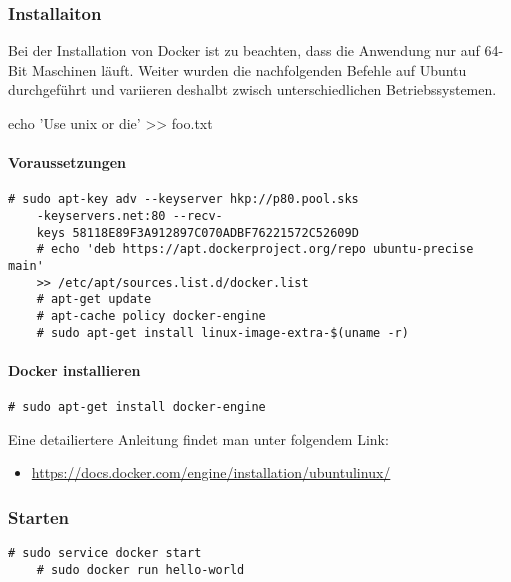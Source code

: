 \subsubsection{Installaiton}
Bei der Installation von Docker ist zu beachten, dass die Anwendung nur auf 64-Bit Maschinen läuft. Weiter wurden die nachfolgenden Befehle auf Ubuntu durchgeführt und variieren deshalbt zwisch unterschiedlichen Betriebssystemen. 

echo 'Use unix or die' >> foo.txt
\paragraph{Voraussetzungen}
\begin{lstlisting}[style=BashInputStyle]
	# sudo apt-key adv --keyserver hkp://p80.pool.sks
	-keyservers.net:80 --recv-		
	keys 58118E89F3A912897C070ADBF76221572C52609D
	# echo 'deb https://apt.dockerproject.org/repo ubuntu-precise main' 
	>> /etc/apt/sources.list.d/docker.list
	# apt-get update
	# apt-cache policy docker-engine
	# sudo apt-get install linux-image-extra-$(uname -r)
\end{lstlisting}
\paragraph{Docker installieren}
\begin{lstlisting}[style=BashInputStyle]
	# sudo apt-get install docker-engine
\end{lstlisting}

Eine detailiertere Anleitung findet man unter folgendem Link:
\begin{itemize}
	\item \url{https://docs.docker.com/engine/installation/ubuntulinux/}
\end{itemize}

\subsubsection{Starten}
\begin{lstlisting}[style=BashInputStyle]
	# sudo service docker start
	# sudo docker run hello-world
\end{lstlisting}

